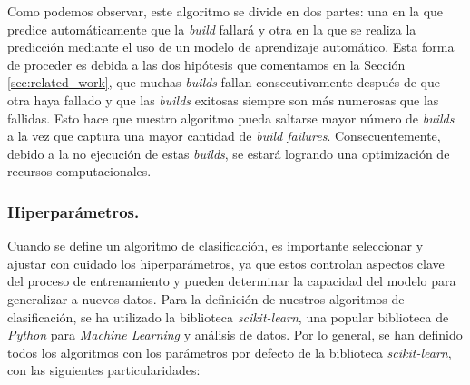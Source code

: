 Como podemos observar, este algoritmo se divide en dos partes: una en la que predice
automáticamente que la \textit{build} fallará y otra en la que se realiza la predicción mediante
el uso de un modelo de aprendizaje automático. Esta forma de proceder es debida a las dos
hipótesis que comentamos en la Sección \ref{sec:related_work}, que muchas \textit{builds} fallan
consecutivamente después de que otra haya fallado y que las \textit{builds} exitosas siempre son
más numerosas que las fallidas. Esto hace que nuestro algoritmo pueda saltarse mayor número de
\textit{builds} a la vez que captura una mayor cantidad de \textit{build failures}.
Consecuentemente, debido a la no ejecución de estas \textit{builds}, se estará logrando una
optimización de recursos computacionales.

\subsubsection{Hiperparámetros.}
Cuando se define un algoritmo de clasificación, es importante seleccionar y ajustar con cuidado
los hiperparámetros, ya que estos controlan aspectos clave del proceso de entrenamiento y pueden
determinar la capacidad del modelo para generalizar a nuevos datos. Para la definición de nuestros
algoritmos de clasificación, se ha utilizado la biblioteca \textit{scikit-learn}, una popular
biblioteca de \textit{Python} para \textit{Machine Learning} y análisis de datos. Por lo general,
se han definido todos los algoritmos con los parámetros por defecto de la biblioteca
\textit{scikit-learn}, con las siguientes particularidades:

